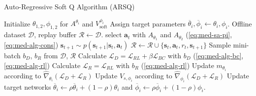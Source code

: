\begin{algorithm}[tb]
    \caption{Auto-Regressive Soft Q Algorithm (ARSQ) }
    \label{pse:med-alg}
\begin{algorithmic}
    \STATE Initialize $\theta_{1, 2}, \phi_{1, 2}$ for $A^{\theta_i}$ and $V_{\text{soft}}^{\phi_i}$
    \STATE Assign target parameters $\overline{\theta}_i,  \overline{\phi}_i \leftarrow \theta_i, \phi_i$.
    \STATE Offline dataset $\mathcal{D}$, replay buffer $\mathcal{R} \leftarrow \mathcal{D}$.
            \STATE select $\mathbf{a}_t$ with $A_{\theta_1}$ and $A_{\theta_2}$ (\ref{eq:med-sa-pi}, \ref{eq:med-alg-cons})
            \STATE $\mathbf{s}_{t+1} \sim p(\mathbf{s}_{t+1} | \mathbf{s}_t, \mathbf{a}_t)$
            \STATE $\mathcal{R} \leftarrow \mathcal{R} \cup \{ \mathbf{s}_t, \mathbf{a}_t, r_t, \mathbf{s}_{t+1} \}$
        \ENDFOR
            \STATE Sample mini-batch $b_D$, $b_R$ from $\mathcal{D}$, $\mathcal{R}$
            \STATE Calculate $\mathcal{L}_D = \mathcal{L}_{RL} + \beta \mathcal{L}_{BC}$ with $b_D$ (\ref{eq:med-alg-bc}, \ref{eq:med-alg-rl})
            \STATE Calculate $\mathcal{L}_R = \mathcal{L}_{RL}$ with $b_R$ (\ref{eq:med-alg-rl})
            \STATE Update $m_{\theta_i}$ according to $\hat{\nabla}_{\theta_i}(\mathcal{L}_D + \mathcal{L}_R)$
            \STATE Update $V_{s, \phi_i}$ according to $\hat{\nabla}_{\phi_i}(\mathcal{L}_D + \mathcal{L}_R)$
            \STATE Update target networks $\overline{\theta}_i \leftarrow \rho \overline{\theta}_i + (1 - \rho) \theta_i$ and $\overline{\phi}_i \leftarrow \rho \overline{\phi}_i + (1 - \rho) \phi_i$.
        \ENDFOR
    \ENDFOR
\end{algorithmic}
\end{algorithm}
